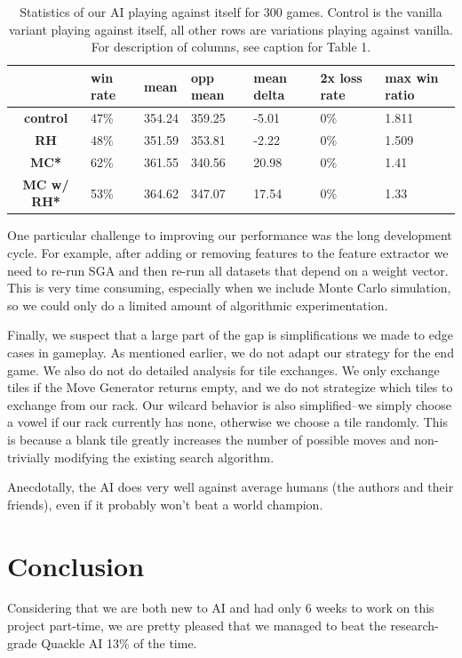 \documentclass[12pt]{article}
\begin{document}
\begin{table}[h!]
  \centering
  \begin{tabular}{c|l|l|l|l|l|l}
    \textbf{} & \textbf{win rate} & \textbf{mean} & \textbf{opp mean} & \textbf{mean delta} &  \textbf{2x loss rate} & \textbf{max win ratio} \\\hline
  \textbf{control}   & 47\% & 354.24 & 359.25 & -5.01  & 0\%  & 1.811\\
  \textbf{RH}        & 48\% & 351.59 & 353.81 & -2.22  & 0\%  & 1.509\\
  \textbf{MC*}       & 62\% & 361.55 & 340.56 & 20.98  & 0\%  & 1.41 \\
  \textbf{MC w/ RH*} & 53\% & 364.62 & 347.07 & 17.54  & 0\%  & 1.33 \\
\end{tabular}
  \caption{Statistics of our AI playing against itself for 300
    games. Control is the vanilla variant playing against itself, all
    other rows are variations playing against vanilla. For description
    of columns, see caption for Table 1.}
\end{table}

One particular challenge to improving our performance was the long
development cycle. For example, after adding or removing features to
the feature extractor we need to re-run SGA and then re-run all
datasets that depend on a weight vector. This is very time consuming,
especially when we include Monte Carlo simulation, so we could only do
a limited amount of algorithmic experimentation.

Finally, we suspect that a large part of the gap is simplifications we
made to edge cases in gameplay. As mentioned earlier, we do not adapt
our strategy for the end game. We also do not do detailed analysis for
tile exchanges. We only exchange tiles if the Move Generator returns
empty, and we do not strategize which tiles to exchange from our
rack. Our wilcard behavior is also simplified--we simply choose a
vowel if our rack currently has none, otherwise we choose a tile
randomly. This is because a blank tile greatly increases the number of
possible moves and non-trivially modifying the existing search
algorithm.

Anecdotally, the AI does very well against average humans (the authors
and their friends), even if it probably won't beat a world champion.

\section*{Conclusion}
Considering that we are both new to AI and had only 6 weeks to work on
this project part-time, we are pretty pleased that we managed to beat
the research-grade Quackle AI 13\% of the time.
\end{document}
